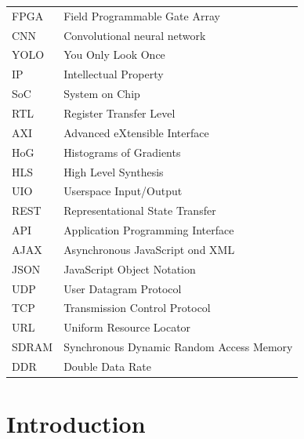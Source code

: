 \documentclass[12pt,a4paper]{report}
\begin{document}
\begin{table}[H]
\centering
\begin{tabular}{ll}
FPGA & Field Programmable Gate Array \\
CNN  & Convolutional neural network  \\
YOLO                     & You Only Look Once                                \\
IP                       & Intellectual Property                             \\
SoC                      & System on Chip                                    \\
RTL                      & Register Transfer Level                           \\
AXI                      & Advanced eXtensible Interface                     \\
HoG                      & Histograms of Gradients                           \\
HLS                      & High Level Synthesis                              \\
UIO                      & Userspace Input/Output                            \\
REST                     & Representational State Transfer                   \\
API                      & Application Programming Interface                 \\
AJAX                     & Asynchronous JavaScript ond XML                   \\
JSON                     & JavaScript Object Notation                        \\
UDP                      & User Datagram Protocol                            \\
TCP                      & Transmission Control Protocol                     \\
URL                      & Uniform Resource Locator                          \\
SDRAM                    & Synchronous Dynamic Random Access Memory          \\
DDR                      & Double Data Rate                                 
\end{tabular}
\end{table}
\newpage
{}
\setcounter{page}{1}

\chapter{\textbf{Introduction}}
\end{document}
